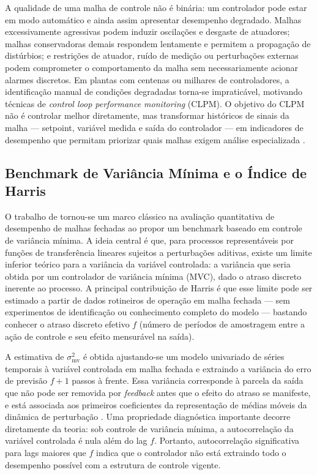 A qualidade de uma malha de controle não é binária: um controlador pode estar em modo automático e ainda assim apresentar desempenho degradado. Malhas excessivamente agressivas podem induzir oscilações e desgaste de atuadores; malhas conservadoras demais respondem lentamente e permitem a propagação de distúrbios; e restrições de atuador, ruído de medição ou perturbações externas podem comprometer o comportamento da malha sem necessariamente acionar alarmes discretos. Em plantas com centenas ou milhares de controladores, a identificação manual de condições degradadas torna-se impraticável, motivando técnicas de \textit{control loop performance monitoring} (CLPM). O objetivo do CLPM não é controlar melhor diretamente, mas transformar históricos de sinais da malha --- setpoint, variável medida e saída do controlador --- em indicadores de desempenho que permitam priorizar quais malhas exigem análise especializada \cite{Bradu2018}.

\subsection{Benchmark de Variância Mínima e o Índice de Harris}

O trabalho de  tornou-se um marco clássico na avaliação quantitativa de desempenho de malhas fechadas ao propor um benchmark baseado em controle de variância mínima. A ideia central é que, para processos representáveis por funções de transferência lineares sujeitos a perturbações aditivas, existe um limite inferior teórico para a variância da variável controlada: a variância que seria obtida por um controlador de variância mínima (MVC), dado o atraso discreto inerente ao processo. A principal contribuição de Harris é que esse limite pode ser estimado a partir de dados rotineiros de operação em malha fechada --- sem experimentos de identificação ou conhecimento completo do modelo --- bastando conhecer o atraso discreto efetivo $f$ (número de períodos de amostragem entre a ação de controle e seu efeito mensurável na saída).

A estimativa de $\sigma^2_{\text{mv}}$ é obtida ajustando-se um modelo univariado de séries temporais à variável controlada em malha fechada e extraindo a variância do erro de previsão $f+1$ passos à frente. Essa variância corresponde à parcela da saída que não pode ser removida por \textit{feedback} antes que o efeito do atraso se manifeste, e está associada aos primeiros coeficientes da representação de médias móveis da dinâmica de perturbação \cite{Harris1989}. Uma propriedade diagnóstica importante decorre diretamente da teoria: sob controle de variância mínima, a autocorrelação da variável controlada é nula além do lag $f$. Portanto, autocorrelação significativa para lags maiores que $f$ indica que o controlador não está extraindo todo o desempenho possível com a estrutura de controle vigente.

